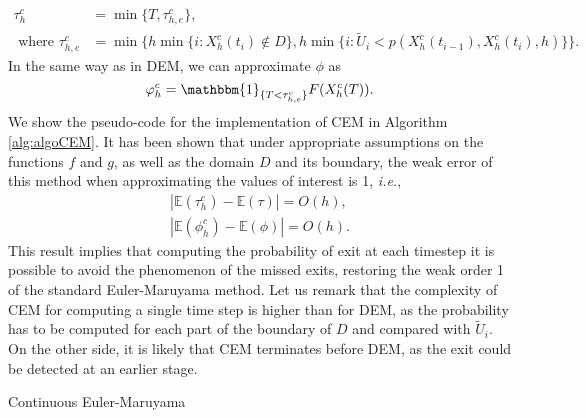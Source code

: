 \begin{equation}\label{eq:TauCEM}
\begin{aligned}
	\tau_h^c &= \min \{T,\tau_{h,e}^c\}, \\
	\text{ where } \tau_{h,e}^c &= \min\{h\min\{i \colon X_h^c(t_i) \notin D\}, h\min\{i \colon \tilde U_i < p(X_h^c(t_{i-1}),X_h^c(t_i),h) \}\}.
\end{aligned}
\end{equation}
In the same way as in DEM, we can approximate $\phi$ as
\begin{equation}\label{eq:PhiCEM}
	\phi_h^c = \mathbbm{1}_{\{T < \tau_{h,e}^c\}}F(X_h^c(T)).
\end{equation}
We show the pseudo-code for the implementation of CEM in Algorithm \ref{alg:algoCEM}. It has been shown \cite{Gobet2010} that under appropriate assumptions on the functions $f$ and $g$, as well as the domain $D$ and its boundary, the weak error of this method when approximating the values of interest is 1, \textit{i.e.},
\begin{align}\label{eq:ConvCEMPhi}
	|\mathbb{E}(\tau_h^c) - \mathbb{E}(\tau)| = O(h), \\
	|\mathbb{E}(\phi_h^c) - \mathbb{E}(\phi)| = O(h).
\end{align}
This result implies that computing the probability of exit at each timestep it is possible to avoid the phenomenon of the missed exits, restoring the weak order 1 of the standard Euler-Maruyama method. Let us remark that the complexity of CEM for computing a single time step is higher than for DEM, as the probability has to be computed for each part of the boundary of $D$ and compared with $\tilde U_i$. On the other side, it is likely that CEM terminates before DEM, as the exit could be detected at an earlier stage.

\begin{algorithm}[t]
\caption{Continuous Euler-Maruyama}
\label{alg:algoCEM}
\end{algorithm}



